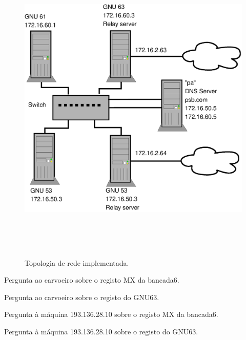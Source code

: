 \documentclass[a4paper,12pt]{article}
\begin{document}
\begin{figure}[htp]
	\begin{center}
		\includegraphics[height=6in]{topologia}
	\end{center}
	\caption{Topologia de rede implementada.}
	\label{fig:topologia}
\end{figure}

\begin{program}
	
  \caption{Pergunta ao carvoeiro sobre o registo MX da bancada6.}
	\label{log:carvoeiromx}
\end{program}

\begin{program}
	
  \caption{Pergunta ao carvoeiro sobre o registo do GNU63.}
	\label{log:carvoeiroa}
\end{program}

\begin{program}
	
  \caption{Pergunta à máquina 193.136.28.10 sobre o registo MX da bancada6.}
	\label{log:193mx}
\end{program}

\begin{program}
	
  \caption{Pergunta à máquina 193.136.28.10 sobre o registo do GNU63.}
	\label{log:193a}
\end{program}
\end{document}

